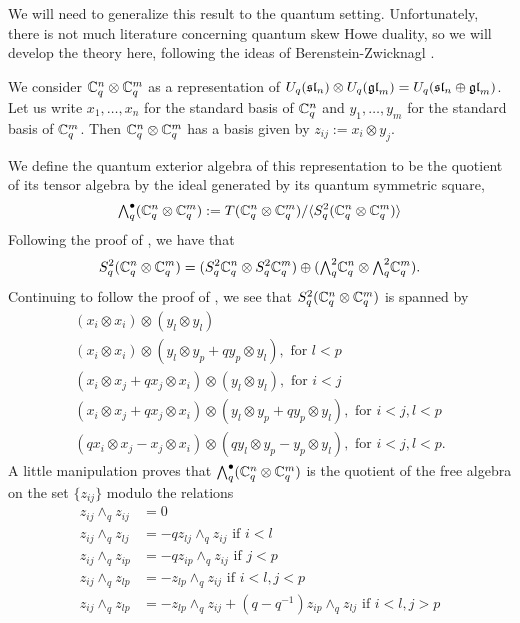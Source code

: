 \documentclass[11pt]{amsart}
\begin{document}
We will need to generalize this result to the quantum setting.  Unfortunately, there is not much literature concerning quantum skew Howe duality, so we will develop the theory here, following the ideas of Berenstein-Zwicknagl \cite{BZ}.

We consider $ {\mathbb{C}}^n_q \otimes {\mathbb{C}}^m_q $ as a representation of $U_q({\mathfrak{sl}}_n) \otimes U_q({\mathfrak{gl}}_m) = U_q({\mathfrak{sl}}_n \oplus {\mathfrak{gl}}_m) $. Let us write $ x_1, \dots, x_n $ for the standard basis of $ {\mathbb{C}}_q^n $ and $ y_1, \dots, y_m $ for the standard basis of $ {\mathbb{C}}_q^m $.  Then $ {\mathbb{C}}_q^n \otimes {\mathbb{C}}_q^m $ has a basis given by $ z_{ij} := x_i \otimes y_j $.

We define the quantum exterior algebra of this representation to be the quotient of its tensor algebra by the ideal generated by its quantum symmetric square,
$${\textstyle\bigwedge^{\bullet}_{q}}({\mathbb{C}}_q^n \otimes {\mathbb{C}}_q^m) := T ({\mathbb{C}}_q^n \otimes {\mathbb{C}}_q^m) / \langle S^2_q ({\mathbb{C}}_q^n \otimes {\mathbb{C}}_q^m) \rangle$$
Following the proof of \cite[Prop. 2.33]{BZ}, we have that
$$ S^2_q ({\mathbb{C}}_q^n \otimes {\mathbb{C}}_q^m) = (S^2_q {\mathbb{C}}_q^n \otimes S^2_q {\mathbb{C}}_q^m) \oplus ({\textstyle\bigwedge^{2}_{q}} {\mathbb{C}}_q^n \otimes {\textstyle\bigwedge^{2}_{q}} {\mathbb{C}}_q^m). $$
Continuing to follow the proof of \cite[Prop. 2.33]{BZ}, we see that $ S^2_q ({\mathbb{C}}_q^n \otimes {\mathbb{C}}_q^m) $ is spanned by
\begin{gather*}
(x_i \otimes x_i) \otimes (y_l \otimes y_l) \\
(x_i \otimes x_i) \otimes (y_l \otimes y_p + q y_p \otimes y_l), \text{ for } l < p \\
(x_i \otimes x_j + q x_j \otimes x_i) \otimes (y_l \otimes y_l), \text{ for } i < j \\
(x_i \otimes x_j + q x_j \otimes x_i) \otimes (y_l \otimes y_p + q y_p \otimes y_l), \text{ for } i < j, l < p \\
(q x_i \otimes x_j -  x_j \otimes x_i) \otimes (q y_l \otimes y_p -  y_p \otimes y_l), \text{ for } i < j, l < p.
\end{gather*}
A little manipulation proves that $ {\textstyle\bigwedge^{\bullet}_{q}}({\mathbb{C}}_q^n \otimes {\mathbb{C}}_q^m) $ is the quotient of the free algebra on the set $ \{ z_{ij} \} $ modulo the relations
\begin{align*}
z_{ij} \wedge_q z_{ij} &= 0 \\
z_{ij} \wedge_q z_{lj} &= - q z_{lj} \wedge_q z_{ij}  \text{ if } i < l \\
z_{ij} \wedge_q z_{ip} &= - q z_{ip} \wedge_q z_{ij} \text{ if } j < p \\
z_{ij} \wedge_q z_{lp} &= - z_{lp} \wedge_q z_{ij} \text{ if  } i < l, j < p \\
z_{ij} \wedge_q z_{lp} &= - z_{lp} \wedge_q z_{ij} + (q - q^{-1}) z_{ip} \wedge_q z_{lj} \text{ if } i < l, j > p
\end{align*}
\end{document}
